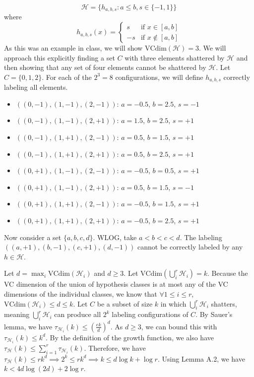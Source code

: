 \documentclass[10pt]{article}
\newenvironment{problem}[2][Problem]{\begin{trivlist}
\item[\hskip \labelsep {\bfseries #1}\hskip \labelsep {\bfseries #2.}]}{\end{trivlist}}
\begin{document}
\begin{problem}{9}
    $$\mathcal{H} = \{h_{a,b,s} : a \leq b, s \in \{-1, 1\}\}$$ where
    $$h_{a,b,s}(x) = \begin{cases}
        s & \text{if } x \in [a, b] \\
        -s & \text{if } x \notin [a, b]
    \end{cases}$$
    As this was an example in class, we will show $\text{VCdim}(\mathcal{H}) = 3$. We will approach this explicitly finding a set $C$ with three elements shattered by $\mathcal{H}$ and then showing that any set of four elements cannot be shattered by $\mathcal{H}$.
    Let $C = \{0, 1, 2\}$. For each of the $2^3 = 8$ configurations, we will define $h_{a,b,s}$ correctly labeling all elements.
    \begin{itemize}
        \item $((0, -1), (1, -1), (2, -1))$: $a = -0.5$, $b = 2.5$, $s = -1$
        \item $((0, -1), (1, -1), (2, +1))$: $a = 1.5$, $b = 2.5$, $s = +1$
        \item $((0, -1), (1, +1), (2, -1))$: $a = 0.5$, $b = 1.5$, $s = +1$
        \item $((0, -1), (1, +1), (2, +1))$: $a = 0.5$, $b = 2.5$, $s = +1$
        \item $((0, +1), (1, -1), (2, -1))$: $a =-0.5$, $b = 0.5$, $s = +1$
        \item $((0, +1), (1, -1), (2, +1))$: $a = 0.5$, $b = 1.5$, $s = -1$
        \item $((0, +1), (1, +1), (2, -1))$: $a = -0.5$, $b = 1.5$, $s = +1$
        \item $((0, +1), (1, +1), (2, +1))$: $a = -0.5$, $b = 2.5$, $s = +1$
    \end{itemize}
    Now consider a set $\{a, b, c, d\}$. WLOG, take $a < b < c < d$. The labeling $((a, +1), (b, -1), (c, +1), (d, -1))$ cannot be correctly labeled by any $h \in \mathcal{H}$.

\end{problem}

\begin{problem}{11 (part 1)}
    Let $d = \max_i \text{VCdim}(\mathcal{H}_i)$ and $d \geq 3$. Let $\text{VCdim}(\bigcup_i^r \mathcal{H}_i) = k$.
    Because the VC dimension of the union of hypothesis classes is at most any of the VC dimensions of the individual classes, we know that $\forall 1 \leq i \leq r$, $\text{VCdim}(\mathcal{H}_i) \leq d \leq k$.
    Let $C$ be a subset of size $k$ in which $\bigcup_i^r \mathcal{H}_i$ shatters, meaning $\bigcup_i^r \mathcal{H}_i$ can produce all $2^k$ labeling configurations of $C$.
    By Sauer's lemma, we have $\tau_{\mathcal{H}_i}(k) \leq \left(\frac{ek}{d}\right)^d$. As $d \geq 3$, we can bound this with $\tau_{\mathcal{H}_i}(k) \leq k^d$.
    By the definition of the growth function, we also have $\tau_\mathcal{H}(k) \leq \sum_{i = 1}^r \tau_{\mathcal{H}_i}(k)$.
    Therefore, we have $\tau_\mathcal{H}(k) \leq r k^d \implies 2^k \leq r k^d \implies k \leq d \log k + \log r$. Using Lemma A.2, we have $k < 4d \log (2d) + 2 \log r$.
\end{problem}
\end{document}
